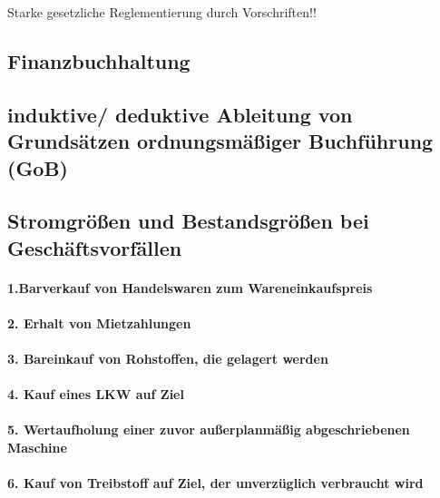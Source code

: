 \documentclass[paper=a4, fontsize=11pt]{scrartcl}
\numberwithin{equation}{section}
\numberwithin{figure}{section}
\numberwithin{table}{section}
\begin{document}
Starke gesetzliche Reglementierung durch Vorschriften!!


\subsection{Finanzbuchhaltung}


\subsection{induktive/ deduktive Ableitung von Grundsätzen ordnungsmäßiger Buchführung (GoB)}


\subsection{Stromgrößen und Bestandsgrößen bei Geschäftsvorfällen}

\paragraph{1.Barverkauf von Handelswaren zum Wareneinkaufspreis}

\paragraph{2. Erhalt von Mietzahlungen}

\paragraph{3. Bareinkauf von Rohstoffen, die gelagert werden}

\paragraph{4. Kauf eines LKW auf Ziel}

\paragraph{5. Wertaufholung einer zuvor außerplanmäßig abgeschriebenen Maschine}

\paragraph{6. Kauf von Treibstoff auf Ziel, der unverzüglich verbraucht wird}
\end{document}
